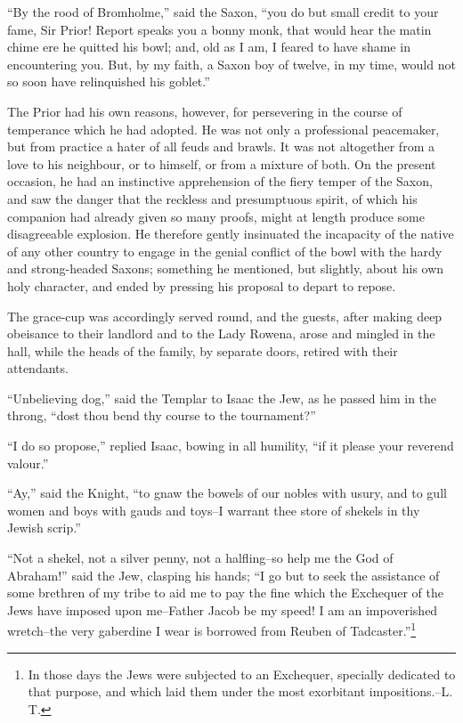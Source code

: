 ``By the rood of Bromholme,'' said the Saxon, ``you do but small credit
to your fame, Sir Prior! Report speaks you a bonny monk, that would hear
the matin chime ere he quitted his bowl; and, old as I am, I feared to
have shame in encountering you. But, by my faith, a Saxon boy of twelve,
in my time, would not so soon have relinquished his goblet.''

The Prior had his own reasons, however, for persevering in the course of
temperance which he had adopted. He was not only a professional
peacemaker, but from practice a hater of all feuds and brawls. It was
not altogether from a love to his neighbour, or to himself, or from a
mixture of both. On the present occasion, he had an instinctive
apprehension of the fiery temper of the Saxon, and saw the danger that
the reckless and presumptuous spirit, of which his companion had already
given so many proofs, might at length produce some disagreeable
explosion. He therefore gently insinuated the incapacity of the native
of any other country to engage in the genial conflict of the bowl with
the hardy and strong-headed Saxons; something he mentioned, but
slightly, about his own holy character, and ended by pressing his
proposal to depart to repose.

The grace-cup was accordingly served round, and the guests, after making
deep obeisance to their landlord and to the Lady Rowena, arose and
mingled in the hall, while the heads of the family, by separate doors,
retired with their attendants.

``Unbelieving dog,'' said the Templar to Isaac the Jew, as he passed him
in the throng, ``dost thou bend thy course to the tournament?''

``I do so propose,'' replied Isaac, bowing in all humility, ``if it
please your reverend valour.''

``Ay,'' said the Knight, ``to gnaw the bowels of our nobles with usury,
and to gull women and boys with gauds and toys--I warrant thee store of
shekels in thy Jewish scrip.''

``Not a shekel, not a silver penny, not a halfling--so help me the God
of Abraham!'' said the Jew, clasping his hands; ``I go but to seek the
assistance of some brethren of my tribe to aid me to pay the fine which
the Exchequer of the Jews have imposed upon me--Father Jacob be my
speed! I am an impoverished wretch--the very gaberdine I wear is
borrowed from Reuben of Tadcaster.''\footnote{In those days the Jews were
subjected to an Exchequer,
specially dedicated to that purpose, and which laid them under the most
exorbitant impositions.--L. T.}

